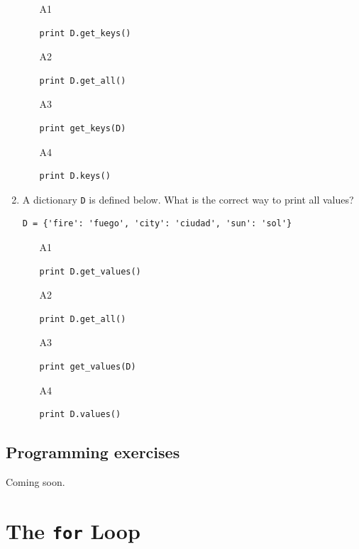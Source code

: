 \begin{enumerate}
\begin{verbatim}
\end{verbatim}
\begin{enumerate}
\item[A1] 
\begin{verbatim}
print D.get_keys()
\end{verbatim}
\item[A2] 
\begin{verbatim}
print D.get_all()
\end{verbatim}
\item[A3] 
\begin{verbatim}
print get_keys(D)
\end{verbatim}
\item[A4] 
\begin{verbatim}
print D.keys()
\end{verbatim}
\end{enumerate}
\item A dictionary {\tt D} is defined below. What is the correct way to print 
all values?
\begin{verbatim}
D = {'fire': 'fuego', 'city': 'ciudad', 'sun': 'sol'}
\end{verbatim}
\begin{enumerate}
\item[A1] 
\begin{verbatim}
print D.get_values()
\end{verbatim}
\item[A2] 
\begin{verbatim}
print D.get_all()
\end{verbatim}
\item[A3] 
\begin{verbatim}
print get_values(D)
\end{verbatim}
\item[A4] 
\begin{verbatim}
print D.values()
\end{verbatim}
\end{enumerate}
\end{enumerate}

\subsection{Programming exercises}

Coming soon.

\section{The {\tt for} Loop} \label{sec:forloop}

